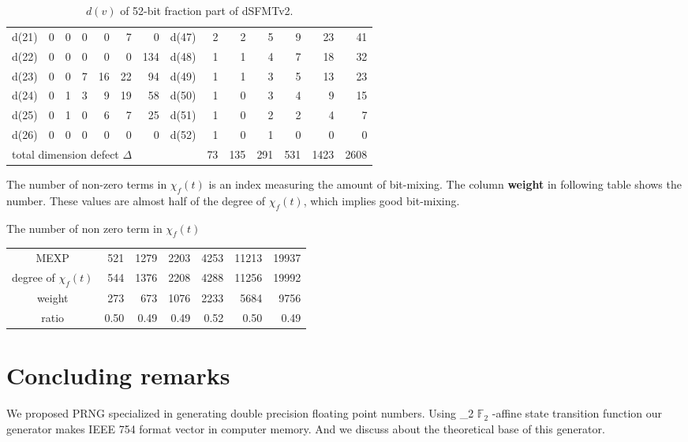 \documentclass{svmult}
\def\bbf2{\ifmmode \mathbb{F}_2 \else $\mathbb{F}_2$ \fi}
\begin{document}
\begin{table}
\begin{center}
\begin{tabular}{|r|rrrrrr||r|rrrrrr|}
      d(21) & 0 & 0 & 0 & 0 & 7 & 0 & d(47) & 2 & 2 & 5 & 9 & 23 & 41 \\
      d(22) & 0 & 0 & 0 & 0 & 0 & 134 & d(48) & 1 & 1 & 4 & 7 & 18 & 32 \\
      d(23) & 0 & 0 & 7 & 16 & 22 & 94 & d(49) & 1 & 1 & 3 & 5 & 13 & 23 \\
      d(24) & 0 & 1 & 3 & 9 & 19 & 58 & d(50) & 1 & 0 & 3 & 4 & 9 & 15 \\
      d(25) & 0 & 1 & 0 & 6 & 7 & 25 & d(51) & 1 & 0 & 2 & 2 & 4 & 7 \\
      d(26) & 0 & 0 & 0 & 0 & 0 & 0 & d(52) & 1 & 0 & 1 & 0 & 0 & 0 \\ \hline
      \multicolumn{8}{|l|}{total dimension defect $\Delta$} 
      & 73 & 135 & 291 & 531 & 1423 & 2608 \\ \hline
    \end{tabular}
  \end{center}
  \caption{$d(v)$ of 52-bit fraction part of dSFMTv2.}
  \label{tab:dd}
\end{table}

\begin{remark}
  The number of non-zero terms in $\chi_f(t)$ is an index measuring
  the amount of bit-mixing.  The column \textbf{weight} in
  following table shows the number. These values are almost
  half of the degree of $\chi_f(t)$, which implies good bit-mixing.
\end{remark}

\begin{center}
  The number of non zero term in $\chi_f(t)$
  \begin{tabular}{c|rrrrrr} \hline
    MEXP & 521 & 1279 & 2203 & 4253 & 11213 & 19937 \\
    degree of $\chi_f(t)$ & 544 & 1376 & 2208 & 4288 & 11256 & 19992 \\
    weight & 273 & 673 & 1076 & 2233 & 5684 & 9756 \\ 
    ratio & 0.50 & 0.49 & 0.49 & 0.52 & 0.50 & 0.49 \\ \hline
  \end{tabular}
\end{center}
\section{Concluding remarks}

We proposed PRNG specialized in generating double precision
floating point numbers. Using \bbf2-affine state transition
function our generator makes IEEE 754 format vector in computer
memory. And we discuss about the theoretical base of this
generator.
\end{document}
